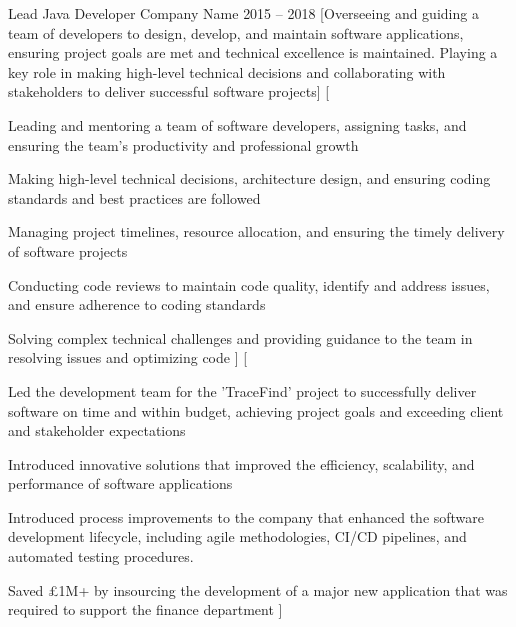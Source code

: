 \documentclass[a4paper]{CV_responsibilities_achievements}
\begin{document}
\Career
    {Lead Java Developer} %
    {Company Name} %
    {2015 -- 2018} %
    [Overseeing and guiding a team of developers to design, develop, and maintain software applications, ensuring project goals are met and technical excellence is maintained. Playing a key role in making high-level technical decisions and collaborating with stakeholders to deliver successful software projects] %
    [
        \item Leading and mentoring a team of software developers, assigning tasks, and ensuring the team's productivity and professional growth
        \item Making high-level technical decisions, architecture design, and ensuring coding standards and best practices are followed
        \item Managing project timelines, resource allocation, and ensuring the timely delivery of software projects
        \item Conducting code reviews to maintain code quality, identify and address issues, and ensure adherence to coding standards
        \item Solving complex technical challenges and providing guidance to the team in resolving issues and optimizing code
    ]
    [
        \item Led the development team for the 'TraceFind' project to successfully deliver software on time and within budget, achieving project goals and exceeding client and stakeholder expectations
        \item Introduced innovative solutions  that improved the efficiency, scalability, and performance of software applications
        \item Introduced process improvements to the company that enhanced the software development lifecycle, including  agile methodologies, CI/CD pipelines, and automated testing procedures.
        \item Saved £1M+ by insourcing the development of a major new application that was required to support the finance department
    ]
    
\end{document}
